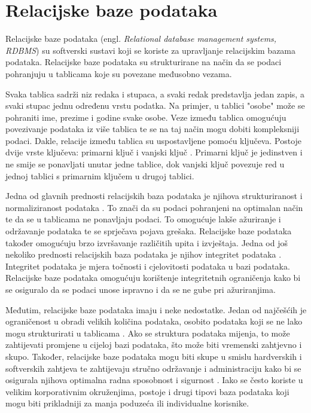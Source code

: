 \documentclass[]{foi}
\begin{document}
\section{Relacijske baze podataka}

Relacijske baze podataka (engl. \textit{Relational database management systems, RDBMS}) \cite{tbp} su softverski sustavi koji se koriste za upravljanje relacijskim bazama podataka. Relacijske baze podataka su strukturirane na način da se podaci pohranjuju u tablicama koje su povezane međusobno vezama.

Svaka tablica sadrži niz redaka i stupaca, a svaki redak predstavlja jedan zapis, a svaki stupac jednu određenu vrstu podatka. Na primjer, u tablici "osobe" može se pohraniti ime, prezime i godine svake osobe. Veze između tablica omogućuju povezivanje podataka iz više tablica te se na taj način mogu dobiti kompleksniji podaci. Dakle, relacije između tablica su uspostavljene pomoću ključeva. Postoje dvije vrste ključeva: primarni ključ i vanjski ključ \cite{tbp}. Primarni ključ je jedinstven i ne smije se ponavljati unutar jedne tablice, dok vanjski ključ povezuje red u jednoj tablici s primarnim ključem u drugoj tablici.

Jedna od glavnih prednosti relacijskih baza podataka je njihova strukturiranost i normaliziranost podataka \cite{tbp}. To znači da su podaci pohranjeni na optimalan način te da se u tablicama ne ponavljaju podaci. To omogućuje lakše ažuriranje i održavanje podataka te se sprječava pojava grešaka. Relacijske baze podataka također omogućuju brzo izvršavanje različitih upita i izvještaja. Jedna od još nekoliko prednosti relacijskih baza podataka je njihov integritet podataka \cite{tbp}. Integritet podataka je mjera točnosti i cjelovitosti podataka u bazi podataka. Relacijske baze podataka omogućuju korištenje integritetnih ograničenja kako bi se osiguralo da se podaci unose ispravno i da se ne gube pri ažuriranjima.

Međutim, relacijske baze podataka imaju i neke nedostatke. Jedan od najčešćih je ograničenost u obradi velikih količina podataka, osobito podataka koji se ne lako mogu strukturirati u tablicama \cite{tbp}. Ako se struktura podataka mijenja, to može zahtijevati promjene u cijeloj bazi podataka, što može biti vremenski zahtjevno i skupo. Također, relacijske baze podataka mogu biti skupe u smislu hardverskih i softverskih zahtjeva te zahtijevaju stručno održavanje i administraciju kako bi se osigurala njihova optimalna radna sposobnost i sigurnost \cite{tbp}. Iako se često koriste u velikim korporativnim okruženjima, postoje i drugi tipovi baza podataka koji mogu biti prikladniji za manja poduzeća ili individualne korisnike.
\newpage
\end{document}
